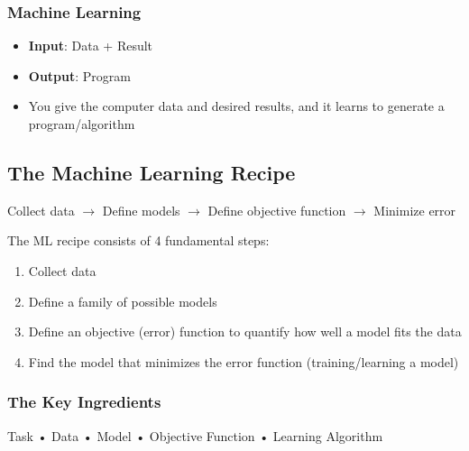 \documentclass[11pt,a4paper]{article}
\theoremstyle{definition}
\theoremstyle{plain}
\theoremstyle{remark}
\begin{document}
\subsubsection{Machine Learning}
\begin{itemize}
    \item \textbf{Input}: Data + Result
    \item \textbf{Output}: Program
    \item You give the computer data and desired results, and it learns to generate a program/algorithm
\end{itemize}

\subsection{The Machine Learning Recipe}

\begin{tcolorbox}[colback=blue!5!white,colframe=blue!75!black,title=\textbf{The 4 Fundamental Steps of ML}]
\begin{center}
Collect data $\rightarrow$ Define models $\rightarrow$ Define objective function $\rightarrow$ Minimize error
\end{center}
\end{tcolorbox}

The ML recipe consists of 4 fundamental steps:
\begin{enumerate}
    \item Collect data
    \item Define a family of possible models
    \item Define an objective (error) function to quantify how well a model fits the data
    \item Find the model that minimizes the error function (training/learning a model)
\end{enumerate}

\subsubsection{The Key Ingredients}

\begin{tcolorbox}[colback=green!5!white,colframe=green!75!black,title=\textbf{5 Essential Ingredients}]
\begin{center}
Task • Data • Model • Objective Function • Learning Algorithm
\end{center}
\end{tcolorbox}
\end{document}
